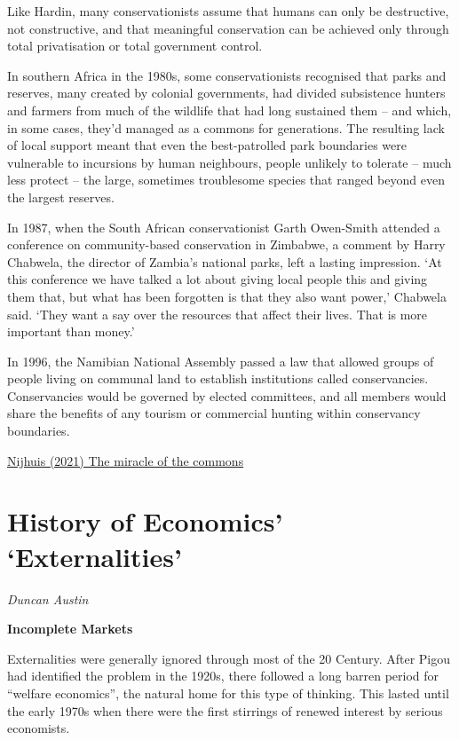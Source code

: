 \documentclass[
]{book}
\begin{document}
Like Hardin, many conservationists assume that humans can only be destructive, not constructive, and that meaningful conservation can be achieved only through total privatisation or total government control.

In southern Africa in the 1980s, some conservationists recognised that parks and reserves, many created by colonial governments, had divided subsistence hunters and farmers from much of the wildlife that had long sustained them -- and which, in some cases, they'd managed as a commons for generations. The resulting lack of local support meant that even the best-patrolled park boundaries were vulnerable to incursions by human neighbours, people unlikely to tolerate -- much less protect -- the large, sometimes troublesome species that ranged beyond even the largest reserves.

In 1987, when the South African conservationist Garth Owen-Smith attended a conference on community-based conservation in Zimbabwe, a comment by Harry Chabwela, the director of Zambia's national parks, left a lasting impression. `At this conference we have talked a lot about giving local people this and giving them that, but what has been forgotten is that they also want power,' Chabwela said. `They want a say over the resources that affect their lives. That is more important than money.'

In 1996, the Namibian National Assembly passed a law that allowed groups of people living on communal land to establish institutions called conservancies. Conservancies would be governed by elected committees, and all members would share the benefits of any tourism or commercial hunting within conservancy boundaries.

\href{The\%20miracle\%20of\%20the\%20commons}{Nijhuis (2021) The miracle of the commons}

\hypertarget{history-of-economics-externalities}{%
\section{History of Economics' `Externalities'}\label{history-of-economics-externalities}}

\emph{Duncan Austin}

\textbf{Incomplete Markets}

Externalities were generally ignored through most of the 20 Century. After Pigou had
identified the problem in the 1920s, there followed a long barren period for ``welfare
economics'', the natural home for this type of thinking. This lasted until the early 1970s when there were the first stirrings of renewed interest by serious economists.
\end{document}
